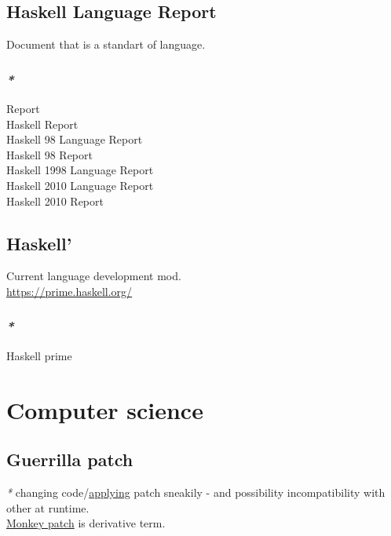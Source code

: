 \documentclass[a4paper,14pt,oneside]{book}
\begin{document}
\section{\label{org1b981a0}Haskell Language Report}
\label{sec:org07a0ae3}
Document that is a standart of language.\\

\subsection{\emph{*}}
\label{sec:org68f1651}
\label{org2a0e035}Report\\
\label{orged0f60c}Haskell Report\\
\label{org34beb4c}Haskell 98 Language Report\\
\label{org0daaf3b}Haskell 98 Report\\
\label{org3e7c615}Haskell 1998 Language Report\\
\label{org2c3fa0b}Haskell 2010 Language Report\\
\label{orgee8e1c3}Haskell 2010 Report\\

\section{\label{orga37a9d2}Haskell'}
\label{sec:orgc880420}
Current language development mod.\\

\url{https://prime.haskell.org/}\\

\subsection{\emph{*}}
\label{sec:org46caa4f}

\label{org3ff93b7}Haskell prime\\

\chapter{Computer science}
\label{sec:orgde71c99}
\section{\label{orgdda47d8}Guerrilla patch}
\label{sec:org235950f}
\emph{*} changing code/\hyperref[orgb099934]{applying} patch sneakily - and possibility incompatibility with other at runtime.\\
\hyperref[orgdc5e157]{Monkey patch} is derivative term.\\
\end{document}
